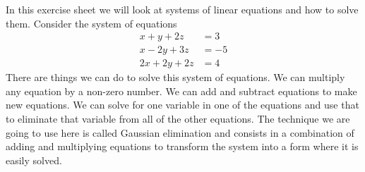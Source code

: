 In this exercise sheet we will look at systems of linear equations and how to
solve them. Consider the system of equations
\begin{align*}
    x + y + 2z &= 3\\
    x - 2y + 3z &= -5\\
    2x + 2y + 2z &= 4
    \label{system1}
\end{align*}
There are things we can do to solve this system of equations. We can multiply
any equation by a non-zero number. We can add and subtract equations to make
new equations. We can solve for one variable in one of the equations and use
that to eliminate that variable from all of the other equations. The technique
we are going to use here is called Gaussian elimination and consists in a
combination of adding and multiplying equations to transform the system into a
form where it is easily solved.

